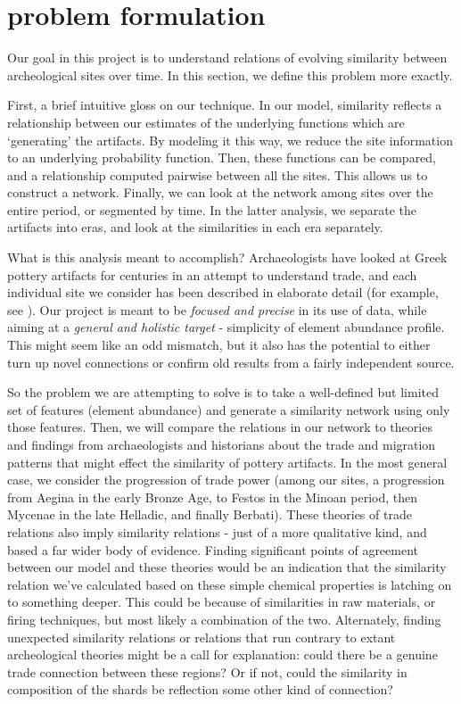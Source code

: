  
\section{problem formulation}

Our goal in this project is to understand relations of evolving similarity between archeological sites over time. In this section, we define this problem more exactly. 

First, a brief intuitive gloss on our technique. In our model, similarity reflects a relationship between our estimates of the underlying functions which are `generating' the artifacts. By modeling it this way, we reduce the site information to an underlying probability function. Then, these functions can be compared, and a relationship computed pairwise between all the sites. This allows us to construct a network.  Finally, we can look at the network among sites over the entire period, or segmented by time. In the latter analysis, we separate the artifacts into eras, and look at the similarities in each era separately.  

What is this analysis meant to accomplish? Archaeologists have looked at Greek pottery artifacts for centuries in an attempt to understand trade, and each individual site we consider has been described in elaborate detail (for example, see \cite{davis1979late}).  Our project is meant to be \textit{focused and precise} in its use of data, while aiming at a \textit{general and holistic target} - simplicity of element abundance profile.  This might seem like an odd mismatch, but it also has the potential to either turn up novel connections or confirm old results from a fairly independent source. 

So the problem we are attempting to solve is to take a well-defined but limited set of features (element abundance) and generate a similarity network using only those features. Then, we will compare the relations in our network to theories and findings from archaeologists and historians about the trade and migration patterns that might effect the similarity of pottery artifacts. In the most general case, we consider the progression of trade power (among our sites, a progression from Aegina in the early Bronze Age, to Festos in the Minoan period, then Mycenae in the late Helladic, and finally Berbati). These theories of trade relations also imply similarity relations - just of a more qualitative kind, and based a far wider body of evidence. Finding significant points of agreement between our model and these theories would be an indication that the similarity relation we've calculated based on these simple chemical properties is latching on to something deeper. This could be because of similarities in raw materials, or firing techniques, but most likely a combination of the two.  Alternately, finding unexpected similarity relations or relations that run contrary to extant archeological theories might be a call for explanation: could there be a genuine trade connection between these regions? Or if not, could the similarity in composition of the shards be reflection some other kind of connection?

